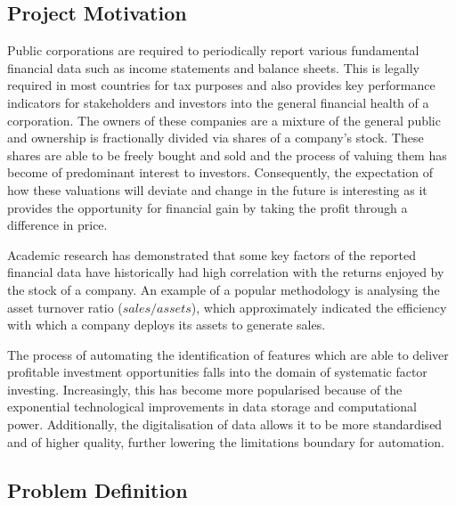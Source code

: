 \documentclass[10pt,onecolumn,letterpaper]{article}
\begin{document}
\subsection{Project Motivation} \label{Project Motivation}

Public corporations are required to periodically report various fundamental financial data such as income statements and balance sheets. This is legally required in most countries for tax purposes and also provides key performance indicators for stakeholders and investors into the general financial health of a corporation. The owners of these companies are a mixture of the general public and ownership is fractionally divided via shares of a company's stock. These shares are able to be freely bought and sold and the process of valuing them has become of predominant interest to investors. Consequently, the expectation of how these valuations will deviate and change in the future is interesting as it provides the opportunity for financial gain by taking the profit through a difference in price. 

Academic research has demonstrated that some key factors of the reported financial data have historically had high correlation with the returns enjoyed by the stock of a company. An example of a popular methodology is analysing the asset turnover ratio ($sales/assets$), which approximately indicated the efficiency with which a company deploys its assets to generate sales. 

The process of automating the identification of features which are able to deliver profitable investment opportunities falls into the domain of  systematic factor investing. Increasingly, this has become more popularised because of the exponential technological improvements in data storage and computational power. Additionally, the digitalisation of data allows it to be more standardised and of higher quality, further lowering the limitations boundary for automation.  

\subsection{Problem Definition} \label{Problem Definition}
\end{document}
